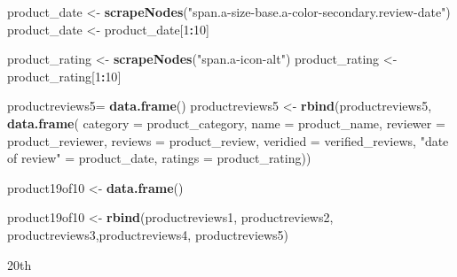 \documentclass[
]{article}
\newenvironment{Shaded}{\begin{snugshade}}{\end{snugshade}}
\newcommand{\AttributeTok}[1]{\textcolor[rgb]{0.13,0.29,0.53}{#1}}
\newcommand{\DecValTok}[1]{\textcolor[rgb]{0.00,0.00,0.81}{#1}}
\newcommand{\FunctionTok}[1]{\textcolor[rgb]{0.13,0.29,0.53}{\textbf{#1}}}
\newcommand{\NormalTok}[1]{#1}
\newcommand{\OtherTok}[1]{\textcolor[rgb]{0.56,0.35,0.01}{#1}}
\newcommand{\SpecialCharTok}[1]{\textcolor[rgb]{0.81,0.36,0.00}{\textbf{#1}}}
\newcommand{\StringTok}[1]{\textcolor[rgb]{0.31,0.60,0.02}{#1}}
\begin{document}
\begin{Shaded}
\begin{Highlighting}[]
\NormalTok{  product\_date }\OtherTok{\textless{}{-}} \FunctionTok{scrapeNodes}\NormalTok{(}\StringTok{"span.a{-}size{-}base.a{-}color{-}secondary.review{-}date"}\NormalTok{)}
\NormalTok{  product\_date }\OtherTok{\textless{}{-}}\NormalTok{ product\_date[}\DecValTok{1}\SpecialCharTok{:}\DecValTok{10}\NormalTok{]}
  
\NormalTok{  product\_rating }\OtherTok{\textless{}{-}} \FunctionTok{scrapeNodes}\NormalTok{(}\StringTok{"span.a{-}icon{-}alt"}\NormalTok{)}
\NormalTok{  product\_rating }\OtherTok{\textless{}{-}}\NormalTok{ product\_rating[}\DecValTok{1}\SpecialCharTok{:}\DecValTok{10}\NormalTok{]}
  
\NormalTok{  productreviews5}\OtherTok{=} \FunctionTok{data.frame}\NormalTok{()}
\NormalTok{  productreviews5 }\OtherTok{\textless{}{-}} \FunctionTok{rbind}\NormalTok{(productreviews5, }\FunctionTok{data.frame}\NormalTok{(}
                      \AttributeTok{category =}\NormalTok{ product\_category,}
                      \AttributeTok{name =}\NormalTok{ product\_name,}
                      \AttributeTok{reviewer =}\NormalTok{ product\_reviewer,}
                      \AttributeTok{reviews =}\NormalTok{ product\_review,}
                      \AttributeTok{veridied =}\NormalTok{ verified\_reviews,}
                      \StringTok{"date of review"} \OtherTok{=}\NormalTok{ product\_date,}
                      \AttributeTok{ratings =}\NormalTok{ product\_rating))}
  
\NormalTok{  product19of10 }\OtherTok{\textless{}{-}} \FunctionTok{data.frame}\NormalTok{()}
  
\NormalTok{  product19of10 }\OtherTok{\textless{}{-}} \FunctionTok{rbind}\NormalTok{(productreviews1, productreviews2, productreviews3,productreviews4, productreviews5)}
\end{Highlighting}
\end{Shaded}

20th
\end{document}
